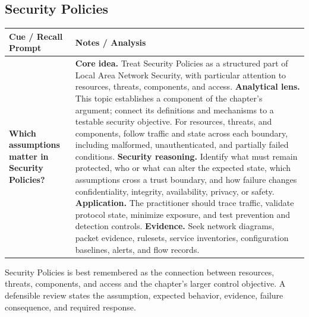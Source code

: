 \documentclass[11pt]{article}
\newcommand{\CornellHeader}{%
\rowcolor{Navy}\color{white}\bfseries Cue / Recall Prompt & \color{white}\bfseries Notes / Analysis\\\hline}
\newcommand{\CornellRow}[2]{%
\cellcolor{CueGray}\RaggedRight\textbf{#1} & \RaggedRight #2\\\hline}
\begin{document}
\subsection*{Security Policies}
\begin{longtable}{>{\RaggedRight\arraybackslash}p{}|>{\RaggedRight\arraybackslash}p{}}
\CornellHeader
\CornellRow{Which assumptions matter in Security Policies?}{\textbf{Core idea.} Treat Security Policies as a structured part of Local Area Network Security, with particular attention to resources, threats, components, and access. \textbf{Analytical lens.} This topic establishes a component of the chapter's argument; connect its definitions and mechanisms to a testable security objective. For resources, threats, and components, follow traffic and state across each boundary, including malformed, unauthenticated, and partially failed conditions. \textbf{Security reasoning.} Identify what must remain protected, who or what can alter the expected state, which assumptions cross a trust boundary, and how failure changes confidentiality, integrity, availability, privacy, or safety. \textbf{Application.} The practitioner should trace traffic, validate protocol state, minimize exposure, and test prevention and detection controls. \textbf{Evidence.} Seek network diagrams, packet evidence, rulesets, service inventories, configuration baselines, alerts, and flow records.}
\end{longtable}
\begin{topicsummary}
Security Policies is best remembered as the connection between resources, threats, components, and access and the chapter's larger control objective. A defensible review states the assumption, expected behavior, evidence, failure consequence, and required response.
\end{topicsummary}
\end{document}
